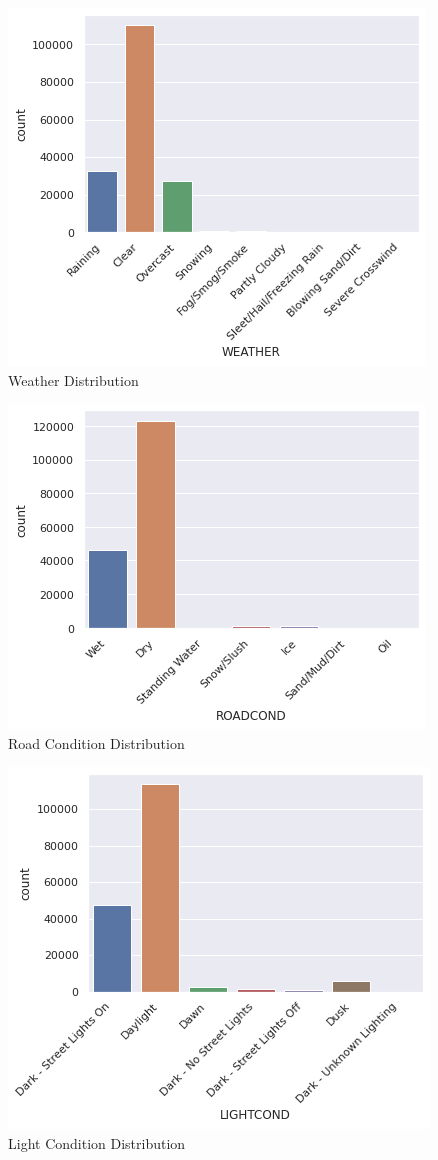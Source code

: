 \documentclass{article}
\begin{document}
\begin{figure}[H]
  \centering
  \includegraphics[scale=0.4]{weather.png}
  \caption{Weather Distribution}
\end{figure}

\begin{figure}[H]
  \centering
  \includegraphics[scale=0.4]{roadcond.png}
  \caption{Road Condition Distribution}
\end{figure}

\begin{figure}[H]
  \centering
  \includegraphics[scale=0.4]{lightcond.png}
  \caption{Light Condition Distribution}
\end{figure}
\end{document}
